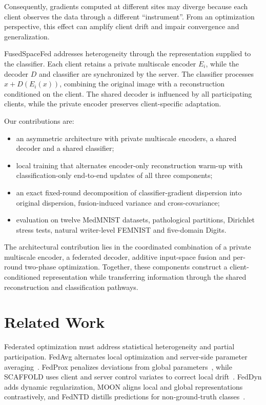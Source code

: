 \documentclass[twoside]{article}
\newif\ifcoauthorreview
\newcommand{\coauthordiffcolor}{\ifcoauthorreview\color[RGB]{0,70,140}\else\color[RGB]{0,0,0}\fi}
\newenvironment{coauthorchange}{\par\begingroup\coauthordiffcolor}{\par\endgroup}
\theoremstyle{thmstyleone}%
\theoremstyle{thmstyletwo}%
\theoremstyle{thmstylethree}%
\begin{document}
\begin{coauthorchange}
Consequently, gradients computed at different sites may diverge because
each client observes the data through a
different ``instrument''. From an optimization perspective, this effect can amplify client drift and impair convergence and generalization.

FusedSpaceFed addresses heterogeneity through the representation supplied to
the classifier. Each client retains a private multiscale encoder $E_i$, while
the decoder $D$ and classifier are synchronized by the server. The classifier
processes $x+D(E_i(x))$, combining the original image with a reconstruction
conditioned on the client. The shared decoder is influenced by all participating clients,
while the private encoder preserves client-specific adaptation.

Our contributions are:
\begin{itemize}
    \item an asymmetric architecture with private multiscale encoders, a shared decoder and a shared classifier;
    \item local training that alternates encoder-only reconstruction warm-up with classification-only end-to-end updates of all three components;
    \item an exact fixed-round decomposition of classifier-gradient dispersion into original dispersion, fusion-induced variance and cross-covariance;
    \item evaluation on twelve MedMNIST datasets, pathological partitions, Dirichlet stress tests, natural writer-level FEMNIST and five-domain Digits.
\end{itemize}

The architectural contribution lies in the coordinated combination of a
private multiscale encoder, a federated decoder, additive input-space fusion
and per-round two-phase optimization. Together, these components construct a
client-conditioned representation while transferring information through the
shared reconstruction and classification pathways.

\end{coauthorchange}

\section{Related Work}\label{sec:background}

Federated optimization must address statistical heterogeneity and partial
participation. FedAvg alternates local optimization and server-side parameter
averaging~\cite{mcmahan2017communication}. FedProx penalizes deviations from
global parameters~\cite{li2018federated}, while SCAFFOLD uses client and server
control variates to correct local drift~\cite{karimireddy2020scaffold}.
FedDyn adds dynamic regularization, MOON aligns local and global representations
contrastively, and FedNTD distills predictions for non-ground-truth
classes~\cite{acar2021feddyn,li2021moon,lee2022preservation}.
\end{document}
